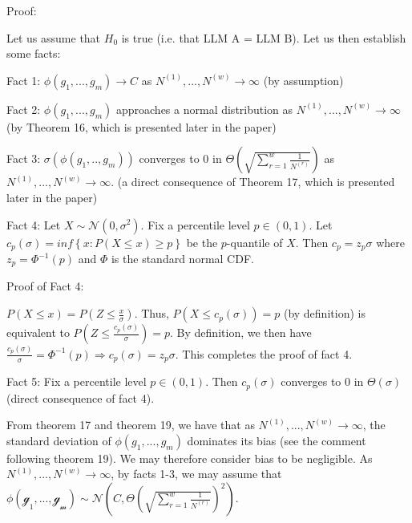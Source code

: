 \documentclass{article}
\begin{document}
Proof:

Let us assume that $\displaystyle H_{0}$ is true (i.e. that LLM A = LLM B). Let us then establish some facts:

Fact 1: $\displaystyle \phi \left( g_{1} ,...,g_{m}\right)\rightarrow C$ as $\displaystyle N^{\left( 1\right)} ,...,N^{\left( w\right)}\rightarrow \infty $ (by assumption)

Fact 2: $\displaystyle \phi \left( g_{1} ,...,g_{m}\right)$ approaches a normal distribution as $\displaystyle N^{\left( 1\right)} ,...,N^{\left( w\right)}\rightarrow \infty $ (by Theorem 16, which is presented later in the paper)

Fact 3: $\displaystyle \sigma \left( \phi \left( g_{1} ,..,g_{m}\right)\right)$ converges to 0 in $\displaystyle \Theta \left(\sqrt{\sum _{r=1}^{w}\frac{1}{N^{\left( r\right)}}}\right)$ as $\displaystyle N^{\left( 1\right)} ,...,N^{\left( w\right)}\rightarrow \infty $. (a direct consequence of Theorem 17, which is presented later in the paper)



Fact 4: Let $\displaystyle X\sim \mathcal{N}\left( 0,\sigma ^{2}\right)$. Fix a percentile level $\displaystyle p\in \left( 0,1\right)$. Let $\displaystyle c_{p}\left( \sigma \right) =inf\left\{x:P\left( X\leqslant x\right) \geqslant p\right\}$ be the $\displaystyle p$-quantile of $\displaystyle X$. Then $\displaystyle c_{p} =z_{p} \sigma $ where $\displaystyle z_{p} =\Phi ^{-1}\left( p\right)$ and $\displaystyle \Phi $ is the standard normal CDF.



Proof of Fact 4:

$\displaystyle P\left( X\leqslant x\right) =P\left( Z\leqslant \frac{x}{\sigma }\right)$. Thus, $\displaystyle P\left( X\leqslant c_{p}\left( \sigma \right)\right) =p$ (by definition) is equivalent to $\displaystyle P\left( Z\leqslant \frac{c_{p}\left( \sigma \right)}{\sigma }\right) =p$. By definition, we then have $\displaystyle \frac{c_{p}\left( \sigma \right)}{\sigma } =\Phi ^{-1}\left( p\right) \Longrightarrow c_{p}\left( \sigma \right) =z_{p} \sigma $. This completes the proof of fact 4.



Fact 5: Fix a percentile level $\displaystyle p\in \left( 0,1\right)$. Then $\displaystyle c_{p}\left( \sigma \right)$ converges to 0 in $\displaystyle \Theta \left( \sigma \right)$ (direct consequence of fact 4).



From theorem 17 and theorem 19, we have that as $\displaystyle N^{\left( 1\right)} ,...,N^{\left( w\right)}\rightarrow \infty $, the standard deviation of $\displaystyle \phi \left( g_{1} ,...,g_{m}\right)$ dominates its bias (see the comment following theorem 19). We may therefore consider bias to be negligible. As $\displaystyle N^{\left( 1\right)} ,...,N^{\left( w\right)}\rightarrow \infty $, by facts 1-3, we may assume that $\displaystyle \phi \mathcal{\left( g_{1} ,...,g_{m}\right) \sim N}\left( C,\Theta \left(\sqrt{\sum _{r=1}^{w}\frac{1}{N^{\left( r\right)}}}\right)^{2}\right)$.
\end{document}
